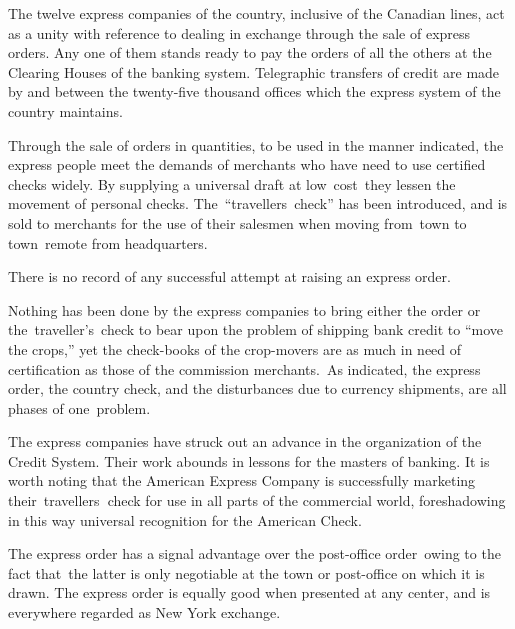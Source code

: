 \documentclass[openany,nobib]{tufte-book}
\begin{document}
\pagebreak The twelve express companies of the country, inclusive of the Canadian
lines, act as a unity with reference to dealing in exchange through the
sale of express orders. Any one of them stands ready to pay the orders
of all the others at the Clearing Houses of the banking system.
Telegraphic transfers of credit are made by and between the twenty-five
thousand offices which the express system of the country maintains.~

Through the sale of orders in quantities, to be used in the manner
indicated, the express people meet the demands of merchants who have
need to use certified checks widely. By supplying a universal draft at
low~cost~they lessen the movement of personal checks.
The~``travellers~check'' has been introduced, and is sold to merchants
for the use of their salesmen when moving from~town to town~remote from
headquarters.~~

There is no record of any successful attempt at raising an express
order.~

Nothing has been done by the express companies to bring either the order
or the~traveller's~check to bear upon the problem of shipping bank
credit to ``move the crops,'' yet the check-books of the crop-movers are
as much in need of certification as those of the commission
merchants.~As indicated, the express order, the country check, and the
disturbances due to currency shipments, are all phases of
one~problem.~~~

The express companies have struck out an advance in the organization of
the Credit System. Their work abounds in lessons for the masters of
banking. It is worth noting that the American Express Company is
successfully marketing their~travellers\textbf{~}check for use in all
parts of the commercial world, foreshadowing in this way universal
recognition for the American Check. ~

The express order has a signal advantage over the post-office
order~owing to the fact that~the latter is only negotiable at the town
or post-office on which it is drawn. The express order is equally good
when presented at any center, and is everywhere regarded as New York
exchange.~
\end{document}
